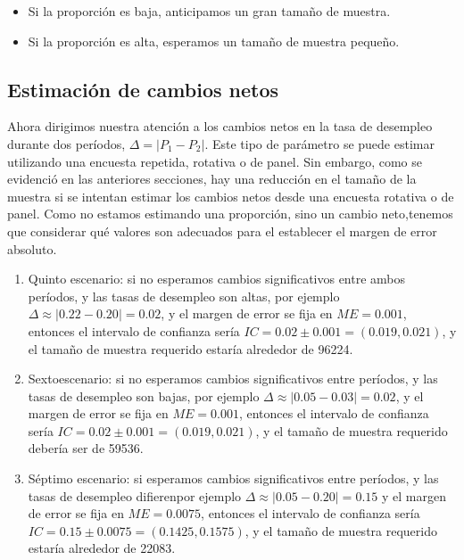 \documentclass[
  12pt,
]{book}
\providecommand{\tightlist}{%
  \setlength{\itemsep}{0pt}\setlength{\parskip}{0pt}}
\begin{document}
\begin{itemize}
\tightlist
\item
  Si la proporción es baja, anticipamos un gran tamaño de muestra.
\item
  Si la proporción es alta, esperamos un tamaño de muestra pequeño.
\end{itemize}

\hypertarget{estimaciuxf3n-de-cambios-netos}{%
\subsection{Estimación de cambios netos}\label{estimaciuxf3n-de-cambios-netos}}

Ahora dirigimos nuestra atención a los cambios netos en la tasa de desempleo durante dos períodos, \(\Delta= |P_{1}-P_{2}|\). Este tipo de parámetro se puede estimar utilizando una encuesta repetida, rotativa o de panel. Sin embargo, como se evidenció en las anteriores secciones, hay una reducción en el tamaño de la muestra si se intentan estimar los cambios netos desde una encuesta rotativa o de panel. Como no estamos estimando una proporción, sino un cambio neto,tenemos que considerar qué valores son adecuados para el establecer el margen de error absoluto.

\begin{enumerate}
\def\labelenumi{\arabic{enumi}.}
\setcounter{enumi}{4}
\item
  Quinto escenario: si no esperamos cambios significativos entre ambos períodos, y las tasas de desempleo son altas, por ejemplo \(\Delta \approx |0.22-0.20|=0.02\), y el margen de error se fija en \(ME = 0.001\), entonces el intervalo de confianza sería \(IC=0.02 \pm 0.001=(0.019,0.021)\), y el tamaño de muestra requerido estaría alrededor de 96224.
\item
  Sextoescenario: si no esperamos cambios significativos entre períodos, y las tasas de desempleo son bajas, por ejemplo \(\Delta \approx |0.05-0.03| =0.02\), y el margen de error se fija en \(ME = 0.001\), entonces el intervalo de confianza sería \(IC=0.02\pm0.001=(0.019,0.021)\), y el tamaño de muestra requerido debería ser de 59536.
\item
  Séptimo escenario: si esperamos cambios significativos entre períodos, y las tasas de desempleo difierenpor ejemplo \(\Delta \approx|0.05-0.20|=0.15\) y el margen de error se fija en \(ME = 0.0075\), entonces el intervalo de confianza sería \(IC=0.15\pm0.0075=(0.1425,0.1575)\), y el tamaño de muestra requerido estaría alrededor de 22083.
\end{enumerate}
\end{document}
